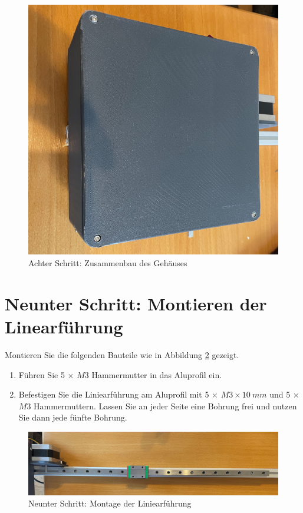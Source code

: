 \begin{figure}[H]
	\begin{center}
		\includegraphics[width=\textwidth]{Images/8Schr.jpg}
		\caption{Achter Schritt: Zusammenbau des Gehäuses} \label{8.S}
	\end{center}
\end{figure}

\section{Neunter Schritt: Montieren der Linearführung}
Montieren Sie die folgenden Bauteile wie in Abbildung \ref{9.S} gezeigt.

\begin{enumerate}
	\item Führen Sie 5 $\times$ $ M3 $ Hammermutter in das Aluprofil ein.
	\item Befestigen Sie die Liniearführung am Aluprofil mit 5 $\times$ $ M3 \times 10 \ mm $ und 5 $\times$ $ M3 $ Hammermuttern. Lassen Sie an jeder Seite eine Bohrung frei und nutzen Sie dann jede fünfte Bohrung. 
\end{enumerate}

\begin{figure}[H]
	\begin{center}
		\includegraphics[width=\textwidth]{Images/9Schr.jpg}
		\caption{Neunter Schritt: Montage der Liniearführung} \label{9.S}
	\end{center}
\end{figure}


